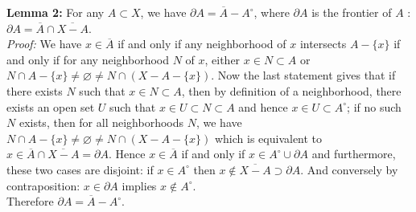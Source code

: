 \documentclass[a4paper]{article}
\begin{document}
    \textbf{Lemma 2:} For any $A \subset X$, we have 
    $\partial A = \overline{A} - A^{\circ}$, where $\partial A$ is the frontier
    of $A$ : $\partial A = \overline{A} \cap \overline{X -A}$. \\
    \linebreak
    \textit{Proof:} We have $x \in \overline{A}$ if and only if
    any neighborhood of  $x$ intersects $A - \{x\}$ if and only if
    for any neighborhood $N$ of $x$, either $x \in N \subset A$ or
    $N \cap A - \{x\} \neq \varnothing \neq N \cap (X-A - \{x\})$.
    Now the last statement gives that if there exists $N$ such that $x \in
    N \subset A$, then by definition of a neighborhood, there exists an open
    set $U$ such that $x \in U \subset N \subset A$ and hence $x \in U \subset
    A^{\circ}$; if no such $N$ exists, then for all neighborhoods $N$, we have
    $N \cap A-\{x\} \neq \varnothing \neq N \cap (X-A - \{x\})$ which is
    equivalent to $x \in \overline{A} \cap \overline{X-A} = \partial A$. Hence
    $x \in \overline{A}$ if and only if $x \in A^{\circ} \cup \partial A$ and
    furthermore, these two cases are disjoint: if $x \in A^{\circ}$ then
    $x \not\in \overline{X-A} \supset \partial A$. And conversely by
    contraposition: $x \in \partial A$ implies $x \not\in A^{\circ}$.\\
    Therefore $\partial A = \overline{A} - A^{\circ}$.\\
    \linebreak
    
    
    
\end{document}
